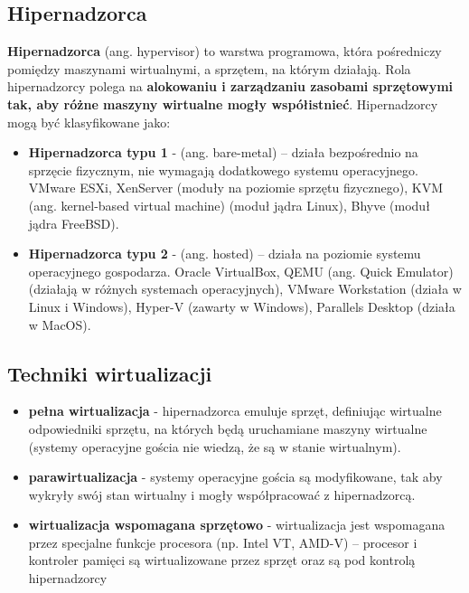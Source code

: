 \documentclass{article}
\begin{document}
\subsection{Hipernadzorca}
\textbf{Hipernadzorca} (ang. hypervisor) to warstwa programowa, która pośredniczy pomiędzy maszynami wirtualnymi, a sprzętem, na którym działają. Rola hipernadzorcy polega na \textbf{alokowaniu i zarządzaniu zasobami sprzętowymi tak, aby różne maszyny wirtualne mogły współistnieć}. Hipernadzorcy mogą być klasyfikowane jako:
\begin{itemize}
    \item \textbf{Hipernadzorca typu 1} - (ang. bare-metal) – działa bezpośrednio na sprzęcie fizycznym, nie wymagają dodatkowego systemu operacyjnego. VMware ESXi, XenServer (moduły na poziomie sprzętu fizycznego), KVM (ang. kernel-based virtual machine) (moduł jądra Linux), Bhyve (moduł jądra FreeBSD).
    \item \textbf{Hipernadzorca typu 2} - (ang. hosted) – działa na poziomie systemu operacyjnego gospodarza. Oracle VirtualBox, QEMU (ang. Quick Emulator) (działają w różnych systemach operacyjnych), VMware Workstation (działa w Linux i Windows), Hyper-V (zawarty w Windows), Parallels Desktop (działa w MacOS).
\end{itemize}

\subsection{Techniki wirtualizacji}
\begin{itemize}
    \item \textbf{pełna wirtualizacja} - hipernadzorca emuluje sprzęt, definiując wirtualne odpowiedniki sprzętu, na których będą uruchamiane maszyny wirtualne (systemy operacyjne gościa nie wiedzą, że są w stanie wirtualnym).
    \item \textbf{parawirtualizacja} - systemy operacyjne gościa są modyfikowane, tak aby wykryły swój stan wirtualny i mogły współpracować z hipernadzorcą.
    \item \textbf{wirtualizacja wspomagana sprzętowo} - wirtualizacja jest wspomagana przez specjalne funkcje procesora (np. Intel VT, AMD-V) – procesor i kontroler pamięci są wirtualizowane przez sprzęt oraz są pod kontrolą hipernadzorcy
\end{itemize}
\end{document}
